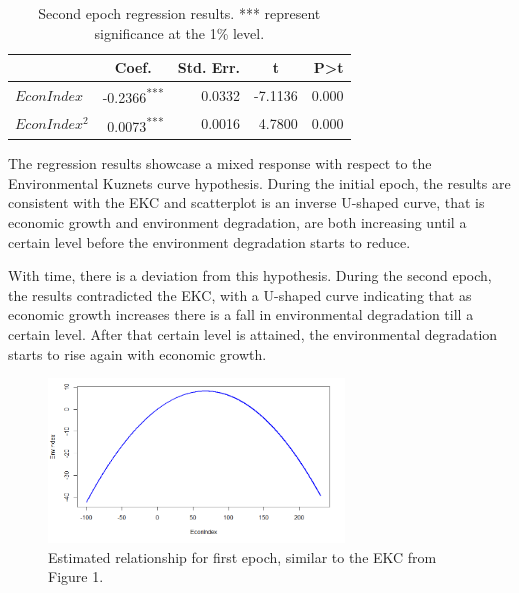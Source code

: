 \documentclass{article}
\begin{document}
\begin{table}[h]
    \centering
    \begin{tabular}{l|rrrr}
    \hline
    \multicolumn{1}{c}{\textbf{}} & \multicolumn{1}{c}{\textbf{Coef.}} & \multicolumn{1}{c}{\textbf{Std. Err.}} & \multicolumn{1}{c}{\textbf{t}} & \textbf{P\textgreater{}t} \\ \hline
    $EconIndex$                     & -0.2366\textsuperscript{***}                             & 0.0332                                 & -7.1136     & 0.000                     \\ 
    $EconIndex^2$                   & 0.0073\textsuperscript{***}                            & 0.0016                                 & 4.7800    & 0.000                    
    \\ \hline        
\end{tabular}
\caption{Second epoch regression results. *** represent significance at the 1\% level.}
\end{table}



The regression results showcase a mixed response with respect to the Environmental Kuznets curve hypothesis. During the initial epoch, the results are consistent with the EKC and scatterplot is an inverse U-shaped curve, that is economic growth and environment degradation, are both increasing until a certain level before the environment degradation starts to reduce.

With time, there is a deviation from this hypothesis. During the second epoch, the results contradicted the EKC, with a U-shaped curve indicating that as economic growth increases there is a fall in environmental degradation till a certain level. After that certain level is attained, the environmental degradation starts to rise again with economic growth.

\begin{figure}[h]
    \centering
    \includegraphics[width=0.7\textwidth]{images/kuznets.png}
    \caption{Estimated relationship for first epoch, similar to the EKC from Figure 1.}
\end{figure}
\end{document}
